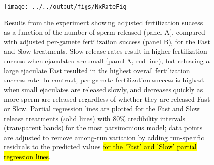 \documentclass{article}
\begin{document}
\begin{figure}[!ht] 
\centering
\texttt{[image: ../../output/figs/NxRateFig]}
\caption{Results from the  experiment showing adjusted fertilization success as a function of the number of sperm released (panel A), compared with adjusted per-gamete fertilization success (panel B), for the Fast and Slow treatments. Slow release rates result in higher fertilization success when ejaculates are small (panel A, red line), but releasing a large ejaculate Fast resulted in the highest overall fertilization success rate. In contrast, per-gamete fertilization success is highest when small ejaculates are released slowly, and decreases quickly as more sperm are released regardless of whether they are released Fast or Slow. Partial regression lines are plotted for the Fast and Slow release treatments (solid lines) with $80\%$ credibility intervals (transparent bands) for the most parsimonious model; data points are adjusted to remove among-run variation by adding run-specific residuals to the predicted values \hl{for the 'Fast' and 'Slow' partial regression lines}.}
\label{fig:perGamete}
\end{figure}

\FloatBarrier

\newpage{}






\end{document}
